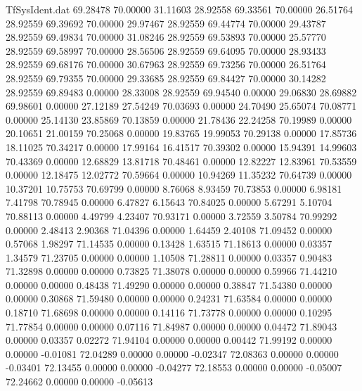 \begin{filecontents}{TfSysIdent.dat}
  69.28478   70.00000   31.11603   28.92558
  69.33561   70.00000   26.51764   28.92559
  69.39692   70.00000   29.97467   28.92559
  69.44774   70.00000   29.43787   28.92559
  69.49834   70.00000   31.08246   28.92559
  69.53893   70.00000   25.57770   28.92559
  69.58997   70.00000   28.56506   28.92559
  69.64095   70.00000   28.93433   28.92559
  69.68176   70.00000   30.67963   28.92559
  69.73256   70.00000   26.51764   28.92559
  69.79355   70.00000   29.33685   28.92559
  69.84427   70.00000   30.14282   28.92559
  69.89483    0.00000   28.33008   28.92559
  69.94540    0.00000   29.06830   28.69882
  69.98601    0.00000   27.12189   27.54249
  70.03693    0.00000   24.70490   25.65074
  70.08771    0.00000   25.14130   23.85869
  70.13859    0.00000   21.78436   22.24258
  70.19989    0.00000   20.10651   21.00159
  70.25068    0.00000   19.83765   19.99053
  70.29138    0.00000   17.85736   18.11025
  70.34217    0.00000   17.99164   16.41517
  70.39302    0.00000   15.94391   14.99603
  70.43369    0.00000   12.68829   13.81718
  70.48461    0.00000   12.82227   12.83961
  70.53559    0.00000   12.18475   12.02772
  70.59664    0.00000   10.94269   11.35232
  70.64739    0.00000   10.37201   10.75753
  70.69799    0.00000    8.76068    8.93459
  70.73853    0.00000    6.98181    7.41798
  70.78945    0.00000    6.47827    6.15643
  70.84025    0.00000    5.67291    5.10704
  70.88113    0.00000    4.49799    4.23407
  70.93171    0.00000    3.72559    3.50784
  70.99292    0.00000    2.48413    2.90368
  71.04396    0.00000    1.64459    2.40108
  71.09452    0.00000    0.57068    1.98297
  71.14535    0.00000    0.13428    1.63515
  71.18613    0.00000    0.03357    1.34579
  71.23705    0.00000    0.00000    1.10508
  71.28811    0.00000    0.03357    0.90483
  71.32898    0.00000    0.00000    0.73825
  71.38078    0.00000    0.00000    0.59966
  71.44210    0.00000    0.00000    0.48438
  71.49290    0.00000    0.00000    0.38847
  71.54380    0.00000    0.00000    0.30868
  71.59480    0.00000    0.00000    0.24231
  71.63584    0.00000    0.00000    0.18710
  71.68698    0.00000    0.00000    0.14116
  71.73778    0.00000    0.00000    0.10295
  71.77854    0.00000    0.00000    0.07116
  71.84987    0.00000    0.00000    0.04472
  71.89043    0.00000    0.03357    0.02272
  71.94104    0.00000    0.00000    0.00442
  71.99192    0.00000    0.00000   -0.01081
  72.04289    0.00000    0.00000   -0.02347
  72.08363    0.00000    0.00000   -0.03401
  72.13455    0.00000    0.00000   -0.04277
  72.18553    0.00000    0.00000   -0.05007
  72.24662    0.00000    0.00000   -0.05613

\end{filecontents}
